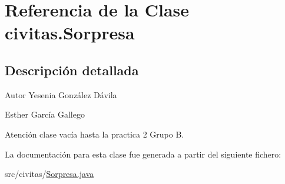 \hypertarget{classcivitas_1_1Sorpresa}{}\section{Referencia de la Clase civitas.\+Sorpresa}
\label{classcivitas_1_1Sorpresa}


\subsection{Descripción detallada}
\begin{DoxyAuthor}{Autor}
Yesenia González Dávila 

Esther García Gallego 
\end{DoxyAuthor}
\begin{DoxyWarning}{Atención}
clase vacía hasta la practica 2 Grupo B. 
\end{DoxyWarning}


La documentación para esta clase fue generada a partir del siguiente fichero\+:\begin{DoxyCompactItemize}
\item 
src/civitas/\hyperlink{Sorpresa_8java}{Sorpresa.\+java}\end{DoxyCompactItemize}
